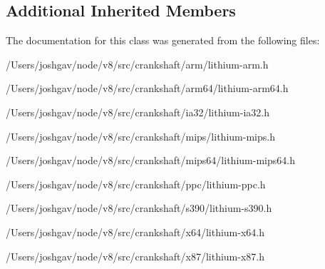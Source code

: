 \subsection*{Additional Inherited Members}


The documentation for this class was generated from the following files\+:\begin{DoxyCompactItemize}
\item 
/\+Users/joshgav/node/v8/src/crankshaft/arm/lithium-\/arm.\+h\item 
/\+Users/joshgav/node/v8/src/crankshaft/arm64/lithium-\/arm64.\+h\item 
/\+Users/joshgav/node/v8/src/crankshaft/ia32/lithium-\/ia32.\+h\item 
/\+Users/joshgav/node/v8/src/crankshaft/mips/lithium-\/mips.\+h\item 
/\+Users/joshgav/node/v8/src/crankshaft/mips64/lithium-\/mips64.\+h\item 
/\+Users/joshgav/node/v8/src/crankshaft/ppc/lithium-\/ppc.\+h\item 
/\+Users/joshgav/node/v8/src/crankshaft/s390/lithium-\/s390.\+h\item 
/\+Users/joshgav/node/v8/src/crankshaft/x64/lithium-\/x64.\+h\item 
/\+Users/joshgav/node/v8/src/crankshaft/x87/lithium-\/x87.\+h\end{DoxyCompactItemize}

